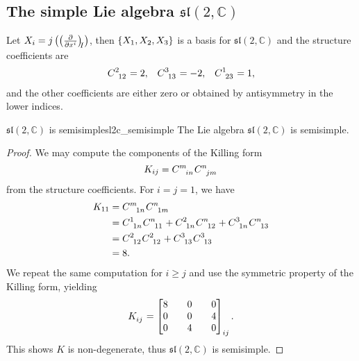 \subsection{The simple Lie algebra \texorpdfstring{\(\mathfrak{sl}(2,\mathbb{C})\)}{sl(2,C)}}

Let \(X_i = j\left(\bvec{x^i}{I}\right)\), then \(\{X_1, X_2, X_3\}\) is a basis for \(\mathfrak{sl}(2,\mathbb{C})\) and the structure coefficients are
\begin{equation*}
    \begin{aligned}
        C\indices{^2_{12}} = 2,&& C\indices{^3_{13}} = -2,&& C\indices{^1_{23}}=1,
    \end{aligned}
\end{equation*}
and the other coefficients are either zero or obtained by antisymmetry in the lower indices.

\begin{proposition}{\(\mathfrak{sl}(2,\mathbb{C})\) is semisimple}{sl2c_semisimple}
    The Lie algebra \(\mathfrak{sl}(2,\mathbb{C})\) is semisimple.
\end{proposition}
\begin{proof}
    We may compute the components of the Killing form
    \begin{equation*}
        K_{ij} = C\indices{^m_{in}}C\indices{^n_{jm}}
    \end{equation*}
    from the structure coefficients. For \(i = j = 1\), we have
    \begin{align*}
        K_{11} &= C\indices{^m_{1n}}C\indices{^n_{1m}}\\
               &= C\indices{^1_{1n}}C\indices{^n_{11}} + C\indices{^2_{1n}}C\indices{^n_{12}} + C\indices{^3_{1n}}C\indices{^n_{13}}\\
               &= C\indices{^2_{12}}C\indices{^2_{12}} + C\indices{^3_{13}}C\indices{^3_{13}}\\
               &= 8.
    \end{align*}
    We repeat the same computation for \(i \geq j\) and use the symmetric property of the Killing form, yielding
    \begin{equation*}
        K\indices{_{ij}} = \begin{bmatrix}
            8 && 0 && 0\\
            0 && 0 && 4\\
            0 && 4 && 0
        \end{bmatrix}_{ij}.
    \end{equation*}
    This shows \(K\) is non-degenerate, thus \(\mathfrak{sl}(2,\mathbb{C})\) is semisimple.
\end{proof}

